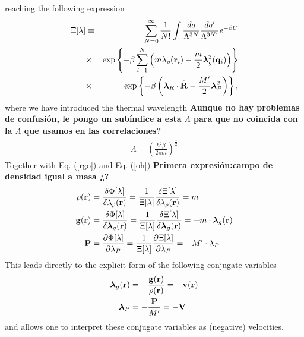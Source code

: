 \documentclass[b5paper,openright,11pt]{book}
\newcommand{\Note}[1]{{\bf \color{red}#1}}    %
\begin{document}
reaching the following expression 
\begin{eqnarray}
\Xi [\lambda]
&\equiv&
 \sum_{N=0}^\infty \frac{1}{N!}
\int \frac{dq}{\Lambda^{3N}}\frac{dq'}{\Lambda^{3N'}}e^{-\beta U}
\nonumber\\
&\times&\exp\left\{-\beta \sum_{i=1}^N\left(m\lambda_\rho({\bf
    r}_i)-\frac{m}{2}\boldsymbol{\lambda}_{g}^2({\bf q}_i)\right)\right\}
\nonumber\\
&\times&\exp\left\{-\beta \left(\boldsymbol{\lambda}_R\cdot\hat{\bf R}-\frac{M'}{2}\boldsymbol{\lambda}_{P}^2\right)\right\},
\label{xiln2}
\end{eqnarray}
where we have introduced the thermal wavelength  \Note{Aunque no hay problemas de confusión, le pongo un subíndice a esta $\Lambda$ para que no coincida con la $\Lambda$ que usamos en las correlaciones?}
\begin{align}
\Lambda=\left(\frac{h^2\beta}{2\pi m}\right)^{\frac{1}{2}}
\label{ThermalWave}
\end{align}
Together with Eq. (\ref{rgo}) and Eq. (\ref{oh}) \Note{Primera expresión:campo de densidad igual a masa ¿?}
\begin{align}
  \rho({\bf r}) &=\frac{\delta \Phi [\lambda]}{\delta \lambda_\rho({\bf r}) } = \frac{1}{\Xi[\lambda]} \frac{\delta\Xi [\lambda]}{\delta \lambda_{\rho}({\bf r})} = m
  \nonumber\\
  {\bf g}({\bf r}) &=\frac{\delta \Phi [\lambda]}{\delta \boldsymbol{\lambda}_g({\bf r}) } =\frac{1}{\Xi[\lambda]} \frac{\delta\Xi [\lambda]}{\delta \boldsymbol{\lambda_g}({\bf r})} = -m\cdot\boldsymbol{\lambda}_g({\bf r})
 \nonumber\\
 {\bf P} &=\frac{\partial \Phi [\lambda]}{\partial \lambda_P} =\frac{1}{\Xi[\lambda]} \frac{\partial\Xi [\lambda]}{\partial \lambda_P} = -M'\cdot\lambda_P
\end{align}
This leads directly to the explicit form of the following conjugate variables
\begin{align}
 \boldsymbol{\lambda}_g({\bf r}) &= -\frac{{\bf g}({\bf r})}{\rho({\bf r})}=-{\bf v}({\bf r})
\nonumber\\
\boldsymbol{\lambda}_P &= -\frac{{\bf P}}{M'} = -{\bf V}
\label{nu}
\end{align}
and allows  one to interpret  these conjugate variables  as (negative)
velocities.  
\end{document}
